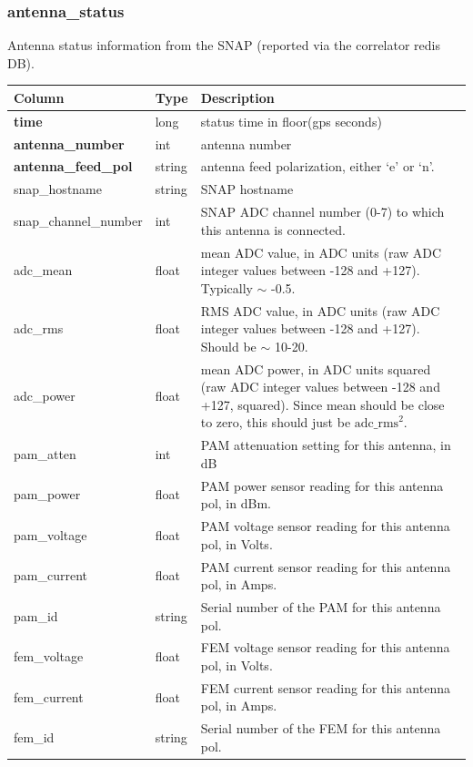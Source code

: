 \documentclass{article}
\begin{document}
{\subsubsection{antenna\_status}
Antenna status information from the SNAP (reported via the correlator redis DB).
\begin{center}
\begin{tabular}{| p{4cm} | p{2cm} | p{10cm} |}
\hline
 {\bf Column} & {\bf Type}  & {\bf Description} \\ [0.5ex]  \hline\hline
\textbf{time} & long & status time in floor(gps seconds)\\ \hline
\textbf{antenna\_number} & int & antenna number \\ \hline
\textbf{antenna\_feed\_pol} & string & antenna feed polarization, either `e' or `n'. \\ \hline
snap\_hostname & string & SNAP hostname \\ \hline
snap\_channel\_number & int & SNAP ADC channel number (0-7) to which this antenna is connected. \\ \hline
adc\_mean & float & mean ADC value, in ADC units (raw ADC integer values between -128 and +127). Typically $\sim$ -0.5. \\ \hline
adc\_rms & float & RMS ADC value, in ADC units (raw ADC integer values between -128 and +127).  Should be $\sim$ 10-20. \\ \hline
adc\_power & float & mean ADC power, in ADC units squared (raw ADC integer values between -128 and +127, squared). Since mean should be close to zero, this should just be $\text{adc\_rms}^2$. \\ \hline
pam\_atten & int & PAM attenuation setting for this antenna, in dB \\ \hline
pam\_power & float & PAM power sensor reading for this antenna pol, in dBm. \\ \hline
pam\_voltage & float & PAM voltage sensor reading for this antenna pol, in Volts. \\ \hline
pam\_current & float & PAM current sensor reading for this antenna pol, in Amps. \\ \hline
pam\_id & string & Serial number of the PAM for this antenna pol. \\ \hline
fem\_voltage & float & FEM voltage sensor reading for this antenna pol, in Volts. \\ \hline
fem\_current & float & FEM current sensor reading for this antenna pol, in Amps. \\ \hline
fem\_id & string & Serial number of the FEM for this antenna pol. \\ \hline

\end{tabular}
\end{center}}
\end{document}
